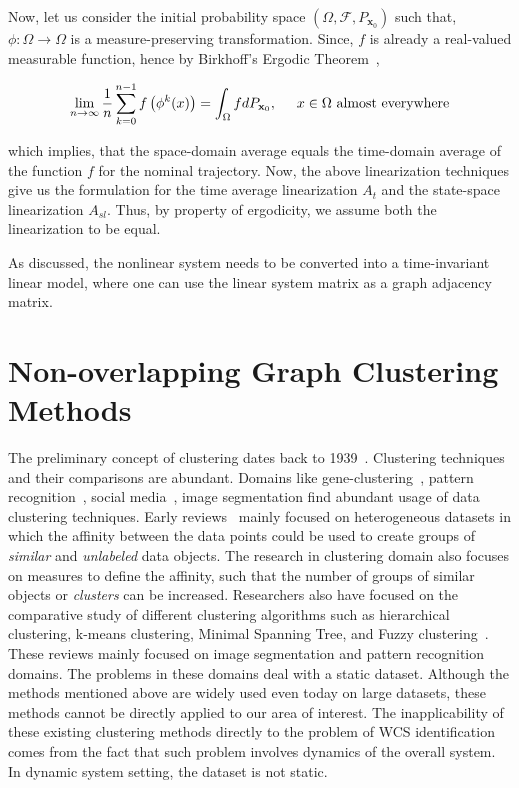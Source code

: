 Now, let us consider the initial probability space $(\Omega,\mathcal{F},P_{\textbf{x}_0})$ such that, $\phi:\Omega \rightarrow \Omega$ is a measure-preserving transformation. Since, $f$ is already a real-valued measurable function, hence by Birkhoff's Ergodic Theorem~\cite{Katok1995}, 

\begin{equation}
\lim_{n \rightarrow \infty} \frac{1}{n} \sum_{k=0}^{n-1} f \left( \phi^k (x) \right) = \int_{\Omega} f dP_{\textbf{x}_0}, \hspace{5 mm} x \in \Omega \text{ almost everywhere}
\end{equation}

\noindent which implies, that the space-domain average equals the time-domain average of the function $f$ for the nominal trajectory. Now, the above linearization techniques give us the formulation for the time average linearization $A_t$ and the state-space linearization $A_{sl}$. Thus, by property of ergodicity, we assume both the linearization to be equal. 

As discussed, the nonlinear system needs to be converted into a time-invariant linear model, where one can use the linear system matrix as a graph adjacency matrix.

\section{Non-overlapping Graph Clustering Methods}
\label{non_overlap_clustering}

The preliminary concept of clustering dates back to 1939~\cite{tryon1939cluster}. Clustering techniques and their comparisons are abundant. Domains like gene-clustering~\cite{eisen1998cluster,sturn2002genesis}, pattern recognition~\cite{bishop2006pattern,baraldi1999survey}, social media~\cite{lancichinetti2008benchmark}, image segmentation find abundant usage of data clustering techniques. Early reviews~\cite{cormack1971review,everitt1972cluster} mainly focused on heterogeneous datasets in which the affinity between the data points could be used to create groups of \textit{similar} and \textit{unlabeled} data objects. The research in clustering domain also focuses on measures to define the affinity, such that the number of groups of similar objects or \textit{clusters} can be increased. Researchers also have focused on the comparative study of different clustering algorithms such as hierarchical clustering, k-means clustering, Minimal Spanning Tree, and Fuzzy clustering~\cite{jain1988algorithms,jain1999data}. These reviews mainly focused on image segmentation and pattern recognition domains. The problems in these domains deal with a static dataset. Although the methods mentioned above are widely used even today on large datasets, these methods cannot be directly applied to our area of interest. The inapplicability of these existing clustering methods directly to the problem of WCS identification comes from the fact that such problem involves dynamics of the overall system. In dynamic system setting, the dataset is not static. 

